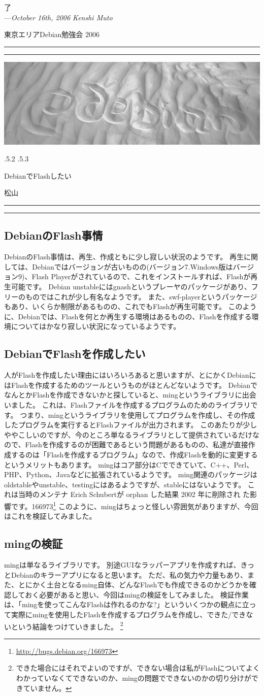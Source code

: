 \documentclass[mingoth,a4paper]{jsarticle}
\makeatletter
\renewcommand{\section}{\@startsection{section}{1}{\z@}%
    {\Cvs \@plus.5\Cdp \@minus.2\Cdp}%
    {.5\Cvs \@plus.3\Cdp}%
    {\normalfont\Huge\headfont\raggedright\centering}} %
\newcommand{\dancersection}[2]{%
\newpage
東京エリアDebian勉強会 2006
\hrule
\vspace{0.5mm}
\hrule
\hfill{}\includegraphics[width=16cm]{image2006-natsu/guruguru-sand-light.png}\\
\vspace{-5cm}
\begin{center}
\section{#1}
\end{center}
\hfill{}\colorbox{white}{#2}\hspace{3cm}\space\\
\vspace{1cm}
\hrule
\vspace{0.5mm}
\hrule
\vspace{1cm}
}
\newcommand{\debianbug}[1]{#1\footnote{\url{http://bugs.debian.org/#1}}}
\makeatother
\begin{document}
\begin{flushright}
  了\\
  ---\emph{October 16th, 2006 Kenshi Muto}
\end{flushright}



\dancersection{DebianでFlashしたい}{松山}

\subsection{DebianのFlash事情}
DebianのFlash事情は、再生、作成ともに少し寂しい状況のようです。
再生に関しては、Debianではバージョンが古いものの(バージョン7.Windows版はバージョン9)、Flash Playerがされているので、これをインストールすれば、Flashが再生可能です。
Debian unstableにはgnashというプレーヤのパッケージがあり、フリーのものではこれが少し有名なようです。
また、swf-playerというパッケージもあり、いくらか制限があるものの、これでもFlashが再生可能です。
このように、Debianでは、Flashを何とか再生する環境はあるものの、Flashを作成する環境についてはかなり寂しい状況になっているようです。

\subsection{DebianでFlashを作成したい}
人がFlashを作成したい理由にはいろいろあると思いますが、とにかくDebianにはFlashを作成するためのツールというものがほとんどないようです。
DebianでなんとかFlashを作成できないかと探していると、mingというライブラリに出会いました。
これは、Flashファイルを作成するプログラムのためのライブラリです。
つまり、mingというライブラリを使用してプログラムを作成し、その作成したプログラムを実行するとFlashファイルが出力されます。
このあたりが少しややこしいのですが、今のところ単なるライブラリとして提供されているだけなので、Flashを作成するのが困難であるという問題があるものの、私達が直接作成するのは「Flashを作成するプログラム」なので、作成Flashを動的に変更するというメリットもあります。
mingはコア部分はCでできていて、C++、Perl、PHP、Python、Javaなどに拡張されているようです。
ming関連のパッケージはoldstableやunstable、testingにはあるようですが、stableにはないようです。
これは当時のメンテナ Erich Schubertが orphan した結果 2002 年に削除され
た影響です。\debianbug{166973}
このように、mingはちょっと怪しい雰囲気がありますが、今回はこれを検証してみました。

\subsection{mingの検証}
mingは単なるライブラリです。
別途GUIなラッパーアプリを作成すれば、きっとDebianのキラーアプリになると思います。
ただ、私の気力や力量もあり、また、とにかく土台となるming自体、どんなFlashでも作成できるのかどうかを確認しておく必要があると思い、今回はmingの検証をしてみました。
検証作業は、「mingを使ってこんなFlashは作れるのかな?」といういくつかの観点に立って実際にmingを使用したFlashを作成するプログラムを作成し、できた/できないという結論をつけていきました。
\footnote{できた場合にはそれでよいのですが、できない場合は私がFlashについてよくわかっていなくてできないのか、mingの問題でできないのかの切り分けができていません。}
\end{document}

